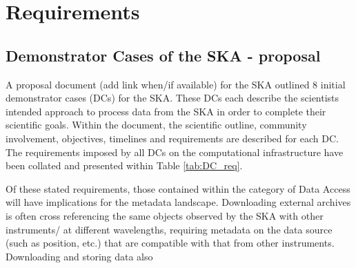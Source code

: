 \section{Requirements}

\subsection{Demonstrator Cases of the SKA - proposal}

A proposal document (add link when/if available) for the SKA outlined 8 initial demonstrator cases (DCs) for the SKA. 
These DCs each describe the scientists intended approach to process data from the SKA in order to complete their scientific goals. 
Within the document, the scientific outline, community involvement, objectives, timelines and requirements are described for each DC.
The requirements imposed by all DCs on the computational infrastructure have been collated and presented within Table \ref{tab:DC_req}. 

\newcommand{\man}[1][]{\(\CIRCLE_{#1}\)}     %
\newcommand{\opt}[1][]{\(\LEFTcircle_{#1}\)} %
\newcommand{\non}{\Circle}                   %



Of these stated requirements, those contained within the category of Data Access will have implications for the metadata landscape.
Downloading external archives is often cross referencing the same objects observed by the SKA with other instruments/ at different wavelengths, requiring metadata on the data source (such as position, etc.) that are compatible with that from other instruments.
Downloading and storing data also 







